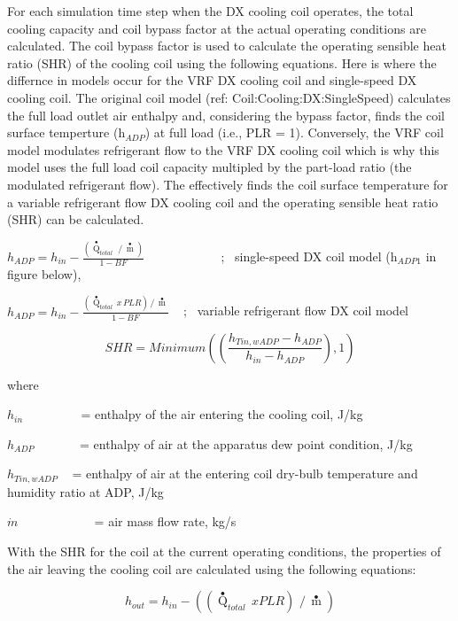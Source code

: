 For each simulation time step when the DX cooling coil operates, the total cooling capacity and coil bypass factor at the actual operating conditions are calculated. The coil bypass factor is used to calculate the operating sensible heat ratio (SHR) of the cooling coil using the following equations. Here is where the differnce in models occur for the VRF DX cooling coil and single-speed DX cooling coil. The original coil model (ref: Coil:Cooling:DX:SingleSpeed) calculates the full load outlet air enthalpy and, considering the bypass factor, finds the coil surface temperture (h\(_{ADP}\)) at full load (i.e., PLR = 1). Conversely, the VRF coil model modulates refrigerant flow to the VRF DX cooling coil which is why this model uses the full load coil capacity multipled by the part-load ratio (the modulated refrigerant flow). The effectively finds the coil surface temperature for a variable refrigerant flow DX cooling coil and the operating sensible heat ratio (SHR) can be calculated.

\({h_{ADP}} = {h_{in}} - \frac{{\left( {{{\mathop Q\limits^ \bullet }_{total}}\,\,/\,\mathop m\limits^ \bullet } \right)}}{{1 - BF}}\) ~~~~~~~~~~~ ;~ single-speed DX coil model (h\(_{ADP1}\) in figure below),

\({h_{ADP}} = {h_{in}} - \frac{{\left( {{{\mathop Q\limits^ \bullet }_{total}}\,x\,PLR} \right)\,/\,\mathop m\limits^ \bullet }}{{1 - BF}}\) ~ ;~ variable refrigerant flow DX coil model

\begin{equation}
SHR = Minimum\left( {\left( {\frac{{{h_{Tin,wADP}} - {h_{ADP}}}}{{{h_{in}} - {h_{ADP}}}}} \right),1} \right)
\end{equation}

where

\({{h_{in}}}\) ~~~~~~~~ = enthalpy of the air entering the cooling coil, J/kg

\({{h_{ADP}}}\) ~~~~~~ = enthalpy of air at the apparatus dew point condition, J/kg

\({{h_{Tin,wADP}}}\) ~ = enthalpy of air at the entering coil dry-bulb temperature and humidity ratio at ADP, J/kg

\(\dot m\) ~~~~~~~~~~~ = air mass flow rate, kg/s

With the SHR for the coil at the current operating conditions, the properties of the air leaving the cooling coil are calculated using the following equations:

\begin{equation}
{h_{out}} = {h_{in}} - \left( {\left( {{{\mathop Q\limits^ \bullet  }_{total}}\,xPLR} \right)\,\,/\,\mathop m\limits^ \bullet  } \right)
\end{equation}

